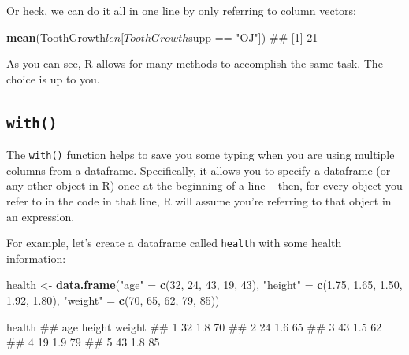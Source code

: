 \documentclass[]{book}
\newenvironment{Shaded}{\begin{snugshade}}{\end{snugshade}}
\newcommand{\KeywordTok}[1]{\textcolor[rgb]{0.13,0.29,0.53}{\textbf{{#1}}}}
\newcommand{\DecValTok}[1]{\textcolor[rgb]{0.00,0.00,0.81}{{#1}}}
\newcommand{\FloatTok}[1]{\textcolor[rgb]{0.00,0.00,0.81}{{#1}}}
\newcommand{\StringTok}[1]{\textcolor[rgb]{0.31,0.60,0.02}{{#1}}}
\newcommand{\NormalTok}[1]{{#1}}
\theoremstyle{definition}
\theoremstyle{definition}
\theoremstyle{remark}
\begin{document}
Or heck, we can do it all in one line by only referring to column
vectors:

\begin{Shaded}
\begin{Highlighting}[]
\KeywordTok{mean}\NormalTok{(ToothGrowth$len[ToothGrowth$supp ==}\StringTok{ "OJ"}\NormalTok{])}
\NormalTok{## [1] 21}
\end{Highlighting}
\end{Shaded}

As you can see, R allows for many methods to accomplish the same task.
The choice is up to you.

\subsection{\texorpdfstring{\texttt{with()}}{with()}}\label{with}

The \texttt{with()} function helps to save you some typing when you are
using multiple columns from a dataframe. Specifically, it allows you to
specify a dataframe (or any other object in R) once at the beginning of
a line -- then, for every object you refer to in the code in that line,
R will assume you're referring to that object in an expression.

For example, let's create a dataframe called \texttt{health} with some
health information:

\begin{Shaded}
\begin{Highlighting}[]
\NormalTok{health <-}\StringTok{ }\KeywordTok{data.frame}\NormalTok{(}\StringTok{"age"} \NormalTok{=}\StringTok{ }\KeywordTok{c}\NormalTok{(}\DecValTok{32}\NormalTok{, }\DecValTok{24}\NormalTok{, }\DecValTok{43}\NormalTok{, }\DecValTok{19}\NormalTok{, }\DecValTok{43}\NormalTok{),}
                     \StringTok{"height"} \NormalTok{=}\StringTok{ }\KeywordTok{c}\NormalTok{(}\FloatTok{1.75}\NormalTok{, }\FloatTok{1.65}\NormalTok{, }\FloatTok{1.50}\NormalTok{, }\FloatTok{1.92}\NormalTok{, }\FloatTok{1.80}\NormalTok{),}
                     \StringTok{"weight"} \NormalTok{=}\StringTok{ }\KeywordTok{c}\NormalTok{(}\DecValTok{70}\NormalTok{, }\DecValTok{65}\NormalTok{, }\DecValTok{62}\NormalTok{, }\DecValTok{79}\NormalTok{, }\DecValTok{85}\NormalTok{))}

\NormalTok{health}
\NormalTok{##   age height weight}
\NormalTok{## 1  32    1.8     70}
\NormalTok{## 2  24    1.6     65}
\NormalTok{## 3  43    1.5     62}
\NormalTok{## 4  19    1.9     79}
\NormalTok{## 5  43    1.8     85}
\end{Highlighting}
\end{Shaded}
\end{document}
